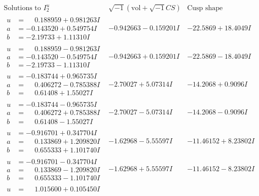 \documentclass[1p]{elsarticle_modified}
\theoremstyle{definition}
\newcommand{\I}{\sqrt{-1}}
\begin{document}
$$\begin{array}{c|c|c}  
\text{Solutions to }I^u_{2}& \I (\text{vol} + \sqrt{-1}CS) & \text{Cusp shape}\\
 \hline 
\begin{aligned}
u &= \phantom{-}0.188959 + 0.981263 I \\
a &= -0.143520 + 0.549754 I \\
b &= -2.19733 + 1.11310 I\end{aligned}
 & -0.942663 - 0.159201 I & -22.5869 + 18.4049 I \\ \hline\begin{aligned}
u &= \phantom{-}0.188959 - 0.981263 I \\
a &= -0.143520 - 0.549754 I \\
b &= -2.19733 - 1.11310 I\end{aligned}
 & -0.942663 + 0.159201 I & -22.5869 - 18.4049 I \\ \hline\begin{aligned}
u &= -0.183744 + 0.965735 I \\
a &= \phantom{-}0.406272 - 0.785388 I \\
b &= \phantom{-}0.61408 + 1.55027 I\end{aligned}
 & -2.70027 + 5.07314 I & -14.2068 + 0.9096 I \\ \hline\begin{aligned}
u &= -0.183744 - 0.965735 I \\
a &= \phantom{-}0.406272 + 0.785388 I \\
b &= \phantom{-}0.61408 - 1.55027 I\end{aligned}
 & -2.70027 - 5.07314 I & -14.2068 - 0.9096 I \\ \hline\begin{aligned}
u &= -0.916701 + 0.347704 I \\
a &= \phantom{-}0.133869 + 1.209820 I \\
b &= \phantom{-}0.655333 + 1.101740 I\end{aligned}
 & -1.62968 - 5.55597 I & -11.46152 + 8.23802 I \\ \hline\begin{aligned}
u &= -0.916701 - 0.347704 I \\
a &= \phantom{-}0.133869 - 1.209820 I \\
b &= \phantom{-}0.655333 - 1.101740 I\end{aligned}
 & -1.62968 + 5.55597 I & -11.46152 - 8.23802 I \\ \hline\begin{aligned}
u &= \phantom{-}1.015600 + 0.105450 I \\

\end{aligned}
\end{array}$$
\end{document}
